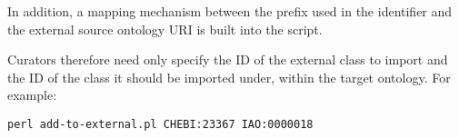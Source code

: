\documentclass[a4paper,10pt,twocolumn]{article}
\newcommand{\protege}{Prot\'{e}g\'{e}}
\begin{document}

In addition, a mapping mechanism between the prefix used in the identifier and the external source ontology URI is built into the script.







Curators therefore need only specify the ID of the external class to import and the ID of the class it should be imported under, within the target ontology.
For example:

\begin{footnotesize}
\begin{verbatim}
perl add-to-external.pl CHEBI:23367 IAO:0000018
\end{verbatim}
\end{footnotesize}
\end{document}
